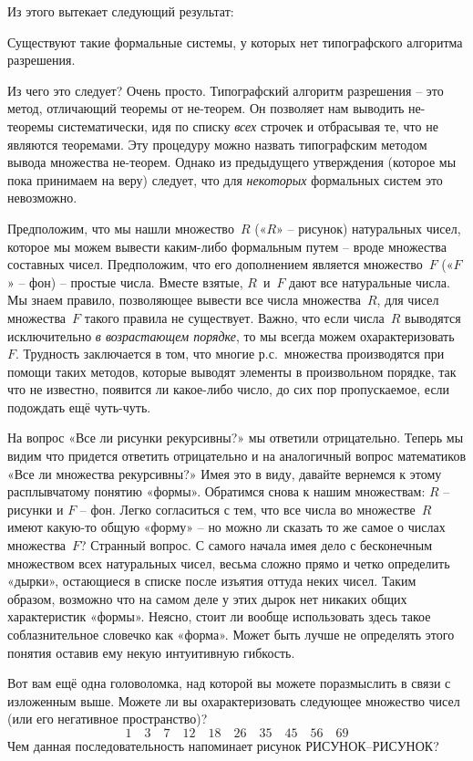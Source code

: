 \documentclass[../main.tex]{subfiles}
\begin{document}
Из этого вытекает следующий результат:
%
\begin{block}
    Существуют такие формальные системы, у которых нет типографского алгоритма разрешения.
\end{block}
%
Из чего это следует? Очень просто. Типографский алгоритм разрешения \--- это метод, отличающий теоремы от не-теорем. Он позволяет нам выводить не-теоремы систематически, идя по списку \emph{всех} строчек и отбрасывая те, что не являются теоремами. Эту процедуру можно назвать типографским методом вывода множества не-теорем. Однако из предыдущего утверждения (которое мы пока принимаем на веру) следует, что для \emph{некоторых} формальных систем это невозможно.

Предположим, что мы нашли множество~$R$ («$R$» \--- рисунок) натуральных чисел, которое мы можем вывести каким-либо формальным путем \--- вроде множества составных чисел. Предположим, что его дополнением является множество~$F$ («$F$» \--- фон) \--- простые числа. Вместе взятые, $R$~и~$F$ дают все натуральные числа. Мы знаем правило, позволяющее вывести все числа множества~$R$, для чисел множества~$F$ такого правила не существует. Важно, что если числа~$R$ выводятся исключительно \emph{в возрастающем порядке}, то мы всегда можем охарактеризовать~$F$. Трудность заключается в том, что многие р.с.\ множества производятся при помощи таких методов, которые выводят элементы в произвольном порядке, так что не известно, появится ли какое-либо число, до сих пор пропускаемое, если подождать ещё чуть-чуть.

На вопрос «Все ли рисунки рекурсивны?» мы ответили отрицательно. Теперь мы видим что придется ответить отрицательно и на аналогичный вопрос математиков «Все ли множества рекурсивны?» Имея это в виду, давайте вернемся к этому расплывчатому понятию «формы». Обратимся снова к нашим множествам: $R$ \--- рисунки и $F$ \--- фон. Легко согласиться с тем, что все числа во множестве~$R$ имеют какую-то общую «форму» \--- но можно ли сказать то же самое о числах множества~$F$? Странный вопрос. С самого начала имея дело с бесконечным множеством всех натуральных чисел, весьма сложно прямо и четко определить «дырки», остающиеся в списке после изъятия оттуда неких чисел. Таким образом, возможно что на самом деле у этих дырок нет никаких общих характеристик «формы». Неясно, стоит ли вообще использовать здесь такое соблазнительное словечко как «форма». Может быть лучше не определять этого понятия оставив ему некую интуитивную гибкость.

Вот вам ещё одна головоломка, над которой вы можете поразмыслить в связи с изложенным выше. Можете ли вы охарактеризовать следующее множество чисел (или его негативное пространство)?
\[
    1 \quad 3 \quad 7 \quad 12 \quad 18 \quad 26 \quad 35 \quad 45 \quad 56 \quad 69
\]
Чем данная последовательность напоминает рисунок РИСУНОК--РИСУНОК?
\end{document}
